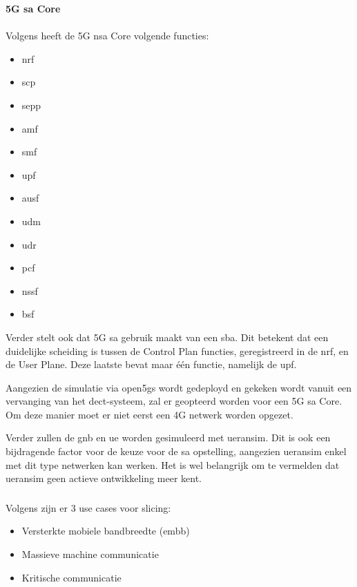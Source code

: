 \textbf{5G \gls{sa} Core}\\\\
Volgens \textcite{Lee2025a} heeft de 5G \gls{nsa} Core volgende functies:

\begin{itemize}
  \item \gls{nrf}
  \item \gls{scp}
  \item \gls{sepp}
  \item \gls{amf}
  \item \gls{smf}
  \item \gls{upf}
  \item \gls{ausf}
  \item \gls{udm}
  \item \gls{udr}
  \item \gls{pcf}
  \item \gls{nssf}
  \item \gls{bsf}
\end{itemize}

Verder stelt \textcite{Lee2025a} ook dat 5G \gls{sa} gebruik maakt van een \gls{sba}. Dit betekent dat een duidelijke scheiding is tussen de Control Plan functies, geregistreerd in de \gls{nrf}, en de User Plane. Deze laatste bevat maar \'e\'en functie, namelijk de \gls{upf}.

Aangezien de simulatie via \gls{open5gs} wordt gedeployd en gekeken wordt vanuit een vervanging van het \gls{dect}-systeem, zal er geopteerd worden voor een 5G \gls{sa} Core. Om deze manier moet er niet eerst een 4G netwerk worden opgezet.

Verder zullen de \gls{gnb} en \gls{ue} worden gesimuleerd met \gls{ueransim}. Dit is ook een bijdragende factor voor de keuze voor de \gls{sa} opstelling, aangezien \gls{ueransim} enkel met dit type netwerken kan werken. Het is wel belangrijk om te vermelden dat \gls{ueransim} geen actieve ontwikkeling meer kent.

\subsubsection{}
\label{sec:Slicing}

%

Volgens \textcite{Foukas2017} zijn er 3 use cases voor slicing:

\begin{itemize}
  \item Versterkte mobiele bandbreedte (\gls{embb})
  \item Massieve machine communicatie
  \item Kritische communicatie
\end{itemize}

